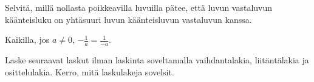 \begin{tehtavasivu}
\begin{tehtava}
Selvitä, millä nollasta poikkeavilla luvuilla pätee, että luvun vastaluvun käänteisluku on yhtäsuuri luvun käänteisluvun vastaluvun kanssa.
\begin{vastaus}
Kaikilla, jos $a \neq 0$, $-\frac{1}{a} = \frac{1}{-a}$.
\end{vastaus}
\end{tehtava}

\begin{tehtava}
Laske seuraavat laskut ilman laskinta soveltamalla vaihdantalakia, liitäntälakia ja osittelulakia.
Kerro, mitä laskulakeja sovelsit.

    \begin{alakohdat}
    \end{alakohdat}
    \begin{vastaus}
    	\begin{alakohdat}
	\end{alakohdat}
    \end{vastaus}
\end{tehtava}


\end{tehtavasivu}
